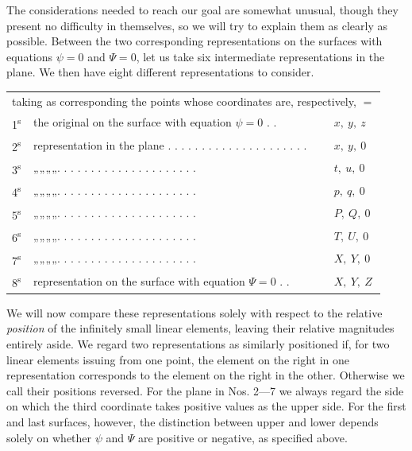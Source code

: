 The considerations needed to reach our goal are somewhat unusual, though they present no difficulty in themselves, so we will try to explain them as clearly as possible. Between the two corresponding representations on the surfaces with equations \(\psi=0\) and \(\Psi=0\), let us take six intermediate representations in the plane. We then have eight different representations to consider.
\begin{center}
\begingroup\fontsize{8}{10}\selectfont\setlength{\tabcolsep}{2pt}
\begin{tabular}{@{}lll@{}}
\multicolumn{3}{r}{\parbox{1.55in}{\raggedright taking as corresponding the points whose coordinates are, respectively, \(=\)}}\\[2pt]
1\textsuperscript{s}&the original on the surface with equation \(\psi=0\) . .&\(x,\ y,\ z\)\\
2\textsuperscript{s}&representation in the plane . . . . . . . . . . . . . . . . . . . . .&\(x,\ y,\ 0\)\\
3\textsuperscript{s}&\quad „\quad „\quad „\quad „\quad . . . . . . . . . . . . . . . . . . . . .&\(t,\ u,\ 0\)\\
4\textsuperscript{s}&\quad „\quad „\quad „\quad „\quad . . . . . . . . . . . . . . . . . . . . .&\(p,\ q,\ 0\)\\
5\textsuperscript{s}&\quad „\quad „\quad „\quad „\quad . . . . . . . . . . . . . . . . . . . . .&\(P,\ Q,\ 0\)\\
6\textsuperscript{s}&\quad „\quad „\quad „\quad „\quad . . . . . . . . . . . . . . . . . . . . .&\(T,\ U,\ 0\)\\
7\textsuperscript{s}&\quad „\quad „\quad „\quad „\quad . . . . . . . . . . . . . . . . . . . . .&\(X,\ Y,\ 0\)\\
8\textsuperscript{s}&representation on the surface with equation \(\Psi=0\) . .&\(X,\ Y,\ Z\)
\end{tabular}\endgroup
\end{center}
\par\indent We will now compare these representations solely with respect to the relative \textit{position} of the infinitely small linear elements, %
%
leaving their relative magnitudes entirely aside. We regard two representations as similarly positioned if, for two linear elements issuing from one point, the element on the right in one representation corresponds to the element on the right in the other. Otherwise we call their positions reversed. For the plane in Nos. 2---7 we always regard the side on which the third coordinate takes positive values as the upper side. For the first and last surfaces, however, the distinction between upper and lower depends solely on whether \(\psi\) and \(\Psi\) are positive or negative, as specified above.

